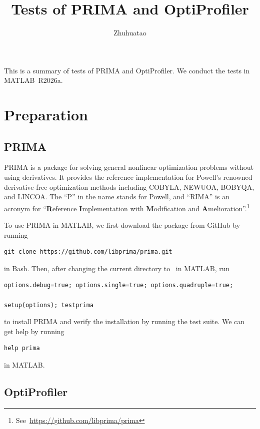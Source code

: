 \documentclass[12pt,a4paper]{article}  %
\title{Tests of PRIMA and OptiProfiler}
\date{\DTMnow}
\author{
    Zhuhuatao
}
\theoremstyle{definition}
\numberwithin{equation}{section}
\begin{document}
\maketitle



This is a summary of tests of PRIMA and OptiProfiler. We conduct the tests in MATLAB~R2026a.

\section{Preparation}

\subsection{PRIMA}

PRIMA is a package for solving general nonlinear optimization problems without using derivatives. It provides the reference implementation for Powell's renowned derivative-free optimization methods including COBYLA, NEWUOA, BOBYQA, and LINCOA. The ``P'' in the name stands for Powell, and ``RIMA'' is an acronym for ``\textbf{R}eference \textbf{I}mplementation with \textbf{M}odification and \textbf{A}melioration''.\footnote{See~\url{https://github.com/libprima/prima}}

To use PRIMA in MATLAB, we first download the package from GitHub by running
\begin{verbatim}
git clone https://github.com/libprima/prima.git
\end{verbatim}
in Bash. Then, after changing the current directory to~ in MATLAB, run 
\begin{verbatim}
options.debug=true; options.single=true; options.quadruple=true; 

setup(options); testprima
\end{verbatim}
to install PRIMA and verify the installation by running the test suite.
We can get help by running 
\begin{verbatim}
help prima
\end{verbatim}
in MATLAB. 

\subsection{OptiProfiler}
\end{document}
